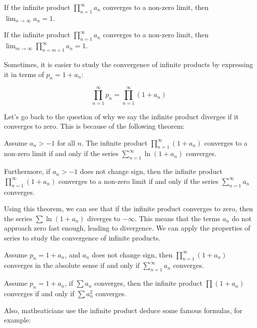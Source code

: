 \begin{theorem}
    If the infinite product $\prod_{n=1}^{\infty} a_n$ converges to a non-zero limit, then $\lim_{n \to \infty} a_n = 1$.
    
    If the infinite product $\prod_{n=1}^{\infty} a_n$ converges to a non-zero limit, then $\lim_{m \to \infty} \prod_{n=m+1}^{\infty} a_n = 1$.
\end{theorem}

Sometimes, it is easier to study the convergence of infinite products by expressing it in terms of $p_n = 1 + a_n$:

\[
\prod_{n=1}^{\infty} p_n = \prod_{n=1}^{\infty} (1 + a_n)
\]

Let's go back to the question of why we say the infinite product diverges if it converges to zero. This is because of the following theorem:

\begin{theorem}
    Assume $a_n > -1$ for all $n$. The infinite product $\prod_{n=1}^{\infty} (1 + a_n)$ converges to a non-zero limit if and only if the series $\sum_{n=1}^{\infty} \ln(1 + a_n)$ converges.
    
    Furthermore, if $a_n > -1$ does not change sign, then the infinite product $\prod_{n=1}^{\infty} (1 + a_n)$ converges to a non-zero limit if and only if the series $\sum_{n=1}^{\infty} a_n$ converges.
\end{theorem}

Using this theorem, we can see that if the infinite product converges to zero, then the series $\sum \ln(1 + a_n)$ diverges to $-\infty$. This means that the terms $a_n$ do not approach zero fast enough, leading to divergence. We can apply the properties of series to study the convergence of infinite products.

\begin{corollary}
    Assume $p_n = 1 + a_n$, and $a_n$ does not change sign, then $\prod_{n=1}^{\infty} (1+a_n)$ converges in the absolute sense if and only if $\sum_{n=1}^{\infty} a_n$ converges.
\end{corollary}

\begin{corollary}
    Assume $p_n = 1 + a_n$, if $\sum a_n$ converges, then the infinite product $\prod (1+a_n)$ converges if and only if $\sum a_n^2$ converges.
\end{corollary}

Also, matheaticians use the infinite product deduce some famous formulas, for example:

